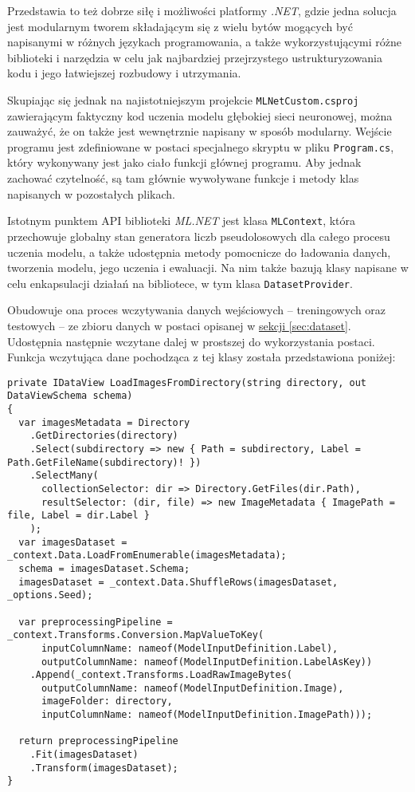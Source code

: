 Przedstawia to też dobrze siłę i możliwości platformy \emph{.NET}, gdzie jedna solucja jest modularnym tworem składającym się z wielu bytów mogących być napisanymi w różnych językach programowania, a także wykorzystującymi różne biblioteki i narzędzia w celu jak najbardziej przejrzystego ustrukturyzowania kodu i jego łatwiejszej rozbudowy i utrzymania.

Skupiając się jednak na najistotniejszym projekcie \lstinline{MLNetCustom.csproj} zawierającym faktyczny kod uczenia modelu głębokiej sieci neuronowej, można zauważyć, że on także jest wewnętrznie napisany w sposób modularny.
Wejście programu jest zdefiniowane w postaci specjalnego skryptu w pliku \lstinline{Program.cs}, który wykonywany jest jako ciało funkcji głównej programu.
Aby jednak zachować czytelność, są tam głównie wywoływane funkcje i metody klas napisanych w pozostałych plikach.

Istotnym punktem API biblioteki \emph{ML.NET} jest klasa \lstinline{MLContext}, która przechowuje globalny stan generatora liczb pseudolosowych dla całego procesu uczenia modelu, a także udostępnia metody pomocnicze do ładowania danych, tworzenia modelu, jego uczenia i ewaluacji.
Na nim także bazują klasy napisane w celu enkapsulacji działań na bibliotece, w tym klasa \lstinline{DatasetProvider}.

Obudowuje ona proces wczytywania danych wejściowych -- treningowych oraz testowych -- ze zbioru danych w postaci opisanej w \hyperref[sec:dataset]{sekcji \ref*{sec:dataset}}.
Udostępnia następnie wczytane dalej w prostszej do wykorzystania postaci.
Funkcja wczytująca dane pochodząca z tej klasy została przedstawiona poniżej:

\begin{lstlisting}[language={[Sharp]C}]
private IDataView LoadImagesFromDirectory(string directory, out DataViewSchema schema)
{
  var imagesMetadata = Directory
    .GetDirectories(directory)
    .Select(subdirectory => new { Path = subdirectory, Label = Path.GetFileName(subdirectory)! })
    .SelectMany(
      collectionSelector: dir => Directory.GetFiles(dir.Path),
      resultSelector: (dir, file) => new ImageMetadata { ImagePath = file, Label = dir.Label }
    );
  var imagesDataset = _context.Data.LoadFromEnumerable(imagesMetadata);
  schema = imagesDataset.Schema;
  imagesDataset = _context.Data.ShuffleRows(imagesDataset, _options.Seed);

  var preprocessingPipeline = _context.Transforms.Conversion.MapValueToKey(
      inputColumnName: nameof(ModelInputDefinition.Label),
      outputColumnName: nameof(ModelInputDefinition.LabelAsKey))
    .Append(_context.Transforms.LoadRawImageBytes(
      outputColumnName: nameof(ModelInputDefinition.Image),
      imageFolder: directory,
      inputColumnName: nameof(ModelInputDefinition.ImagePath)));

  return preprocessingPipeline
    .Fit(imagesDataset)
    .Transform(imagesDataset);
}
\end{lstlisting}


